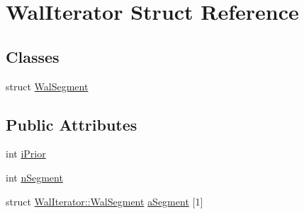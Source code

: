 \hypertarget{struct_wal_iterator}{\section{Wal\-Iterator Struct Reference}
\label{struct_wal_iterator}
}
\subsection*{Classes}
\begin{DoxyCompactItemize}
\item 
struct \hyperlink{struct_wal_iterator_1_1_wal_segment}{Wal\-Segment}
\end{DoxyCompactItemize}
\subsection*{Public Attributes}
\begin{DoxyCompactItemize}
\item 
int \hyperlink{struct_wal_iterator_a2f906125490dd3e967fc53768b03abbb}{i\-Prior}
\item 
int \hyperlink{struct_wal_iterator_ad81bc9447d6043212289d127dc9fdafa}{n\-Segment}
\item 
struct \hyperlink{struct_wal_iterator_1_1_wal_segment}{Wal\-Iterator\-::\-Wal\-Segment} \hyperlink{struct_wal_iterator_a6d3fcaaeeca5a0eee46f9fa7c3cb669b}{a\-Segment} \mbox{[}1\mbox{]}
\end{DoxyCompactItemize}


